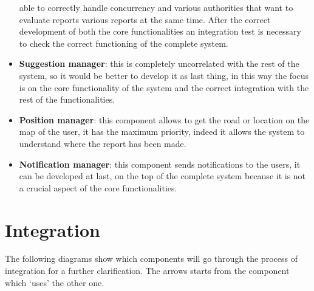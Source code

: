\documentclass[12pt,a4paper]{report}
\begin{document}
\begin{itemize}
					able to correctly handle concurrency and various authorities that want to evaluate reports various
					reports at the same time. After the correct development of both the core functionalities an integration
					test is necessary to check the correct functioning of the complete system.  
				\item \textbf{Suggestion manager}: this is completely uncorrelated with the rest of the system, so it would be
					better to develop it as last thing, in this way the focus is on the core functionality of the system and
					the correct integration with the rest of the functionalities.
				\item \textbf{Position manager}: this component allows to get the road or location on the map of the
					user, it has the maximum priority, indeed it allows the system to understand where the report has been
					made.
				\item \textbf{Notification manager}: this component sends notifications to the users, it can be developed at
					last, on the top of the complete system because it is not a crucial aspect of the core functionalities.
			\end{itemize}
		\section{Integration}
		The following diagrams show which components will go through the process of 
			integration for a further clarification. The arrows starts from the component which ‘uses’ the other one.
\end{document}
